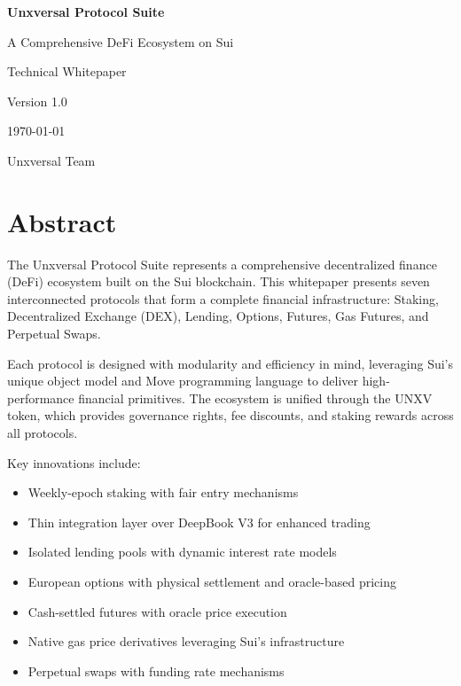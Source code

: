 \documentclass[12pt]{article}
\begin{document}
\begin{titlepage}
\centering
\vspace*{2in}

{\Huge \textbf{Unxversal Protocol Suite}}

\vspace{0.5in}
{\Large A Comprehensive DeFi Ecosystem on Sui}

\vspace{1in}
{\large Technical Whitepaper}

\vspace{1in}
{\large Version 1.0}

\vspace{1in}
{\large \today}

\vfill
{\large Unxversal Team}

\end{titlepage}

\newpage
\section*{Abstract}

The Unxversal Protocol Suite represents a comprehensive decentralized finance (DeFi) ecosystem built on the Sui blockchain. This whitepaper presents seven interconnected protocols that form a complete financial infrastructure: Staking, Decentralized Exchange (DEX), Lending, Options, Futures, Gas Futures, and Perpetual Swaps.

Each protocol is designed with modularity and efficiency in mind, leveraging Sui's unique object model and Move programming language to deliver high-performance financial primitives. The ecosystem is unified through the UNXV token, which provides governance rights, fee discounts, and staking rewards across all protocols.

Key innovations include:
\begin{itemize}
    \item Weekly-epoch staking with fair entry mechanisms
    \item Thin integration layer over DeepBook V3 for enhanced trading
    \item Isolated lending pools with dynamic interest rate models
    \item European options with physical settlement and oracle-based pricing
    \item Cash-settled futures with oracle price execution
    \item Native gas price derivatives leveraging Sui's infrastructure
    \item Perpetual swaps with funding rate mechanisms
\end{itemize}
\end{document}
